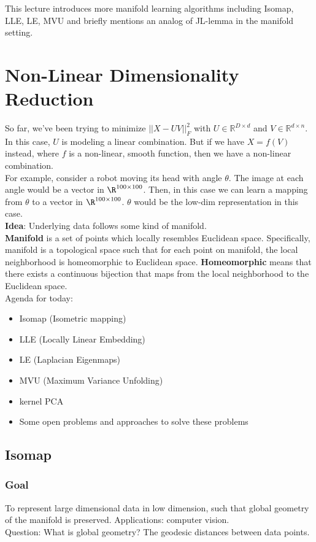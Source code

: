 This lecture introduces more manifold learning algorithms including
Isomap, LLE, LE, MVU and briefly mentions an analog of JL-lemma in the
manifold setting. 

\section{Non-Linear Dimensionality Reduction}
So far, we've been trying to minimize $||X-UV||_F^2$ with  $U\in \mathbb{R}^{D\times d}$ and $V\in \mathbb{R}^{d\times n}$. In this case, $U$ is modeling a linear combination. But if we have $X=f(V)$ instead, where $f$ is a non-linear, smooth function, then we have a non-linear combination. \\
For example, consider a robot moving its head with angle $\theta$. The image at each angle would be a vector in $\R^{100 \times 100}$. Then, in this case we can learn a mapping from $\theta$ to a vector in $\R^{100 \times 100}$. $\theta$ would be the low-dim representation in this case.\\

\textbf{Idea}: Underlying data follows some kind of manifold. \\

\textbf{Manifold} is a set of points which locally resembles Euclidean space. Specifically, manifold is a topological space such that for each point on manifold, the local neighborhood is homeomorphic to Euclidean space. \textbf{Homeomorphic} means that there exists a continuous bijection that maps from the local neighborhood to the Euclidean space. \\

Agenda for today:
\begin{itemize}
\item Isomap (Isometric mapping)
\item LLE (Locally Linear Embedding)
\item LE (Laplacian Eigenmaps)
\item MVU (Maximum Variance Unfolding)
\item kernel PCA
\item Some open problems and approaches to solve these problems
\end{itemize}

\subsection{Isomap}
\subsubsection*{Goal}
To represent large dimensional data in low dimension, such that global geometry of the manifold is preserved. Applications: computer vision. \\
Question: What is global geometry? The geodesic distances between data points. 

